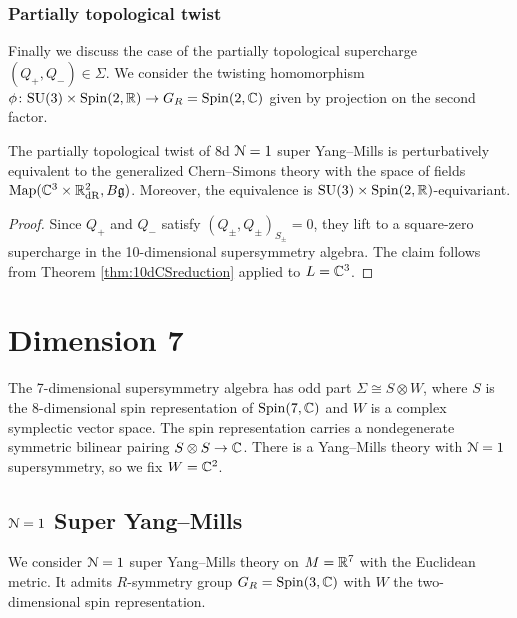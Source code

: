 \documentclass[10pt, oneside]{article}
\begin{document}
\subsubsection{Partially topological twist}
\label{sect:8dpartiallytopologicaltwist}

Finally we discuss the case of the partially topological supercharge $(Q_+, Q_-)\in\Sigma$. We consider the twisting homomorphism $\phi\colon \mathrm{SU}(3)\times \mathrm{Spin}(2, \mathbb R)\rightarrow G_R=\mathrm{Spin}(2, \mathbb C)$ given by projection on the second factor.

\begin{theorem}
The partially topological twist of 8d $\mathcal N=1$ super Yang--Mills is perturbatively equivalent to the generalized Chern--Simons theory with the space of fields $\operatorname{Map}(\mathbb C^3\times \mathbb R^2_{\mathrm{dR}}, B\mathfrak g)$. Moreover, the equivalence is $\mathrm{SU}(3)\times \mathrm{Spin}(2, \mathbb R)$-equivariant.
\label{thm:8dpartiallytopologicaltwist}
\end{theorem}
\begin{proof}
Since $Q_+$ and $Q_-$ satisfy $(Q_\pm, Q_\pm)_{S_\pm} = 0$, they lift to a square-zero supercharge in the 10-dimensional supersymmetry algebra. The claim follows from Theorem \ref{thm:10dCSreduction} applied to $L=\mathbb C^3$.
\end{proof}

\section{Dimension 7} \label{7d_section}

The 7-dimensional supersymmetry algebra has odd part $\Sigma\cong S\otimes W$, where $S$ is the 8-dimensional spin representation of $\mathrm{Spin}(7, \mathbb C)$ and $W$ is a complex symplectic vector space.  The spin representation carries a nondegenerate symmetric bilinear pairing $S\otimes S\rightarrow \mathbb C$. There is a Yang--Mills theory with $\mathcal{N}=1$ supersymmetry, so we fix $W = \mathbb C^2$.

\subsection{\texorpdfstring{$\mathcal N=1$}{N=1} Super Yang--Mills}

We consider $\mathcal N=1$ super Yang--Mills theory on $M=\mathbb R^7$ with the Euclidean metric. It admits $R$-symmetry group $G_R=\mathrm{Spin}(3, \mathbb C)$ with $W$ the two-dimensional spin representation.
\end{document}

